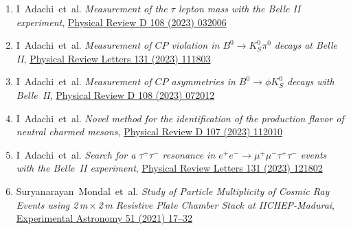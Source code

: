 \documentclass[12pt]{article}
\begin{document}
\begin{justify}
\begin{enumerate}[a.]
\begin{enumerate}[1.]
  \item I~Adachi~et~al. \emph{Measurement of the $\tau$ lepton mass with the Belle II experiment}, \href{https://doi.org/10.1103/PhysRevD.108.032006}{Physical Review D 108 (2023) 032006}
  \item I~Adachi~et~al. \emph{Measurement of $CP$ violation in $B^0 \rightarrow K^0_{S} \pi^0$ decays at Belle II}, \href{https://doi.org/10.1103/PhysRevLett.131.111803}{Physical Review Letters 131 (2023) 111803}
  \item I~Adachi~et~al. \emph{Measurement of $CP$ asymmetries in $B^0 \rightarrow \phi K^0_{S}$ decays with Belle~II}, \href{https://doi.org/10.1103/PhysRevD.108.072012}{Physical Review D 108 (2023) 072012}
  \item I~Adachi~et~al. \emph{Novel method for the identification of the production flavor of neutral charmed mesons}, \href{https://doi.org/10.1103/PhysRevD.107.112010}{Physical Review D 107 (2023) 112010}
  \item I~Adachi~et~al. \emph{Search for a $\tau^+\tau^-$ resonance in $e^{+}e^{-}\rightarrow \mu^{+}\mu^{-} \tau^+\tau^-$ events with the Belle~II experiment}, \href{https://doi.org/10.1103/PhysRevLett.131.121802}{Physical Review Letters 131 (2023) 121802}
  \item Suryanarayan~Mondal~et~al. \emph{Study of Particle Multiplicity of Cosmic Ray Events using 2\,m\,$\times$\,2\,m Resistive Plate Chamber Stack at IICHEP-Madurai}, \href{https://doi.org/10.1007/s10686-020-09685-6}{Experimental Astronomy 51 (2021) 17--32}

\end{enumerate}
\end{enumerate}
\end{justify}
\end{document}
